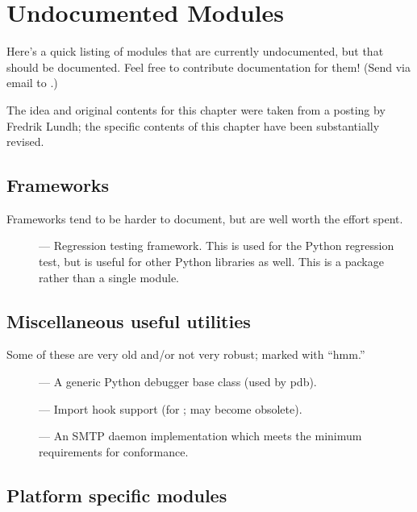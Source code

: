 \chapter{Undocumented Modules \label{undoc}}

Here's a quick listing of modules that are currently undocumented, but
that should be documented.  Feel free to contribute documentation for
them!  (Send via email to .)

The idea and original contents for this chapter were taken
from a posting by Fredrik Lundh; the specific contents of this chapter
have been substantially revised.


\section{Frameworks}

Frameworks tend to be harder to document, but are well worth the
effort spent.

\begin{description}
\item[]
--- Regression testing framework.  This is used for the Python
regression test, but is useful for other Python libraries as well.
This is a package rather than a single module.
\end{description}


\section{Miscellaneous useful utilities}

Some of these are very old and/or not very robust; marked with ``hmm.''

\begin{description}
\item[]
--- A generic Python debugger base class (used by pdb).

\item[]
--- Import hook support (for ; may become obsolete).

\item[]
--- An SMTP daemon implementation which meets the minimum requirements
for  conformance.
\end{description}


\section{Platform specific modules}

